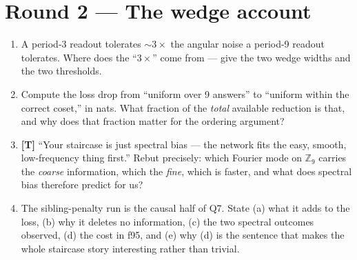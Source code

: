 \documentclass[11pt]{article}
\newcommand{\trap}{\textcolor{trapcol}{\textbf{[T]}}}
\begin{document}
\section*{Round 2 --- The wedge account}
\begin{enumerate}[leftmargin=*,itemsep=4pt,start=5]
\item A period-3 readout tolerates $\sim 3\times$ the angular noise a period-9
readout tolerates. Where does the ``$3\times$'' come from --- give the two wedge
widths and the two thresholds.
\item Compute the loss drop from ``uniform over 9 answers'' to ``uniform within the
correct coset,'' in nats. What fraction of the \emph{total} available reduction is
that, and why does that fraction matter for the ordering argument?
\item \trap{} ``Your staircase is just spectral bias --- the network fits the easy,
smooth, low-frequency thing first.'' Rebut precisely: which Fourier mode on
$\mathbb{Z}_9$ carries the \emph{coarse} information, which the \emph{fine}, which
is faster, and what does spectral bias therefore predict for us?
\item The sibling-penalty run is the causal half of Q7. State (a) what it adds to
the loss, (b) why it deletes no information, (c) the two spectral outcomes
observed, (d) the cost in f95, and (e) why (d) is the sentence that makes the whole
staircase story interesting rather than trivial.
\end{enumerate}
\end{document}
